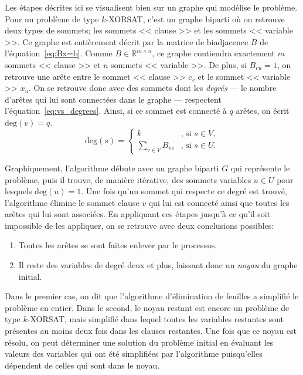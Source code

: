 Les étapes décrites ici se visualisent bien sur un graphe qui modélise le problème.
Pour un problème de type $k$-XORSAT, c'est un graphe biparti où on retrouve deux types de sommets; les sommets << clause >> et les sommets << variable >>.
Ce graphe est entièrement décrit par la matrice de biadjacence $B$ de l'équation~\ref{eq:Bx=b}.
Comme $B \in \mathbb{R}^{m \times n}$, ce graphe contiendra exactement $m$ sommets << clause >> et $n$ sommets << variable >>.
De plus, si $B_{vu} = 1$, on retrouve une arête entre le sommet << clause >> $c_v$ et le sommet << variable >> $x_u$.
On se retrouve donc avec des sommets dont les \emph{degrés} --- le nombre d'arêtes qui lui sont connectées dans le graphe --- respectent l'équation~\ref{eq:vs_degrees}.
Ainsi, si ce sommet est connecté à $q$ arêtes, on écrit $\mathrm{deg}(v) = q$.
\begin{equation}\label{eq:vs_degrees}
    \mathrm{deg}(s) = \begin{cases}
        k & \text{, si } s \in V,\\
        \sum_{v \in V}B_{vs} & \text{, si } s \in U.
    \end{cases}
\end{equation}

Graphiquement, l'algorithme débute avec un graphe biparti $G$ qui représente le problème, puis il trouve, de manière itérative, des sommets variables $u \in U$ pour lesquels $\mathrm{deg}(u) = 1$.
Une fois qu'un sommet qui respecte ce degré est trouvé, l'algorithme élimine le sommet clause $v$ qui lui est connecté ainsi que toutes les arêtes qui lui sont associées.
En appliquant ces étapes jusqu'à ce qu'il soit impossible de les appliquer, on se retrouve avec deux conclusions possibles:
\begin{enumerate}
    \item Toutes les arêtes se sont faites enlever par le processus.
    \item Il reste des variables de degré deux et plus, laissant donc un \emph{noyau} du graphe initial.
\end{enumerate}
Dans le premier cas, on dit que l'algorithme d'élimination de feuilles a simplifié le problème en entier.
Dans le second, le noyau restant est encore un problème de type $k$-XORSAT, mais simplifié dans lequel toutes les variables restantes sont présentes au moins deux fois dans les clauses restantes.
Une fois que ce noyau est résolu, on peut déterminer une solution du problème initial en évaluant les valeurs des variables qui ont été simplifiées par l'algorithme puisqu'elles dépendent de celles qui sont dans le noyau. 

